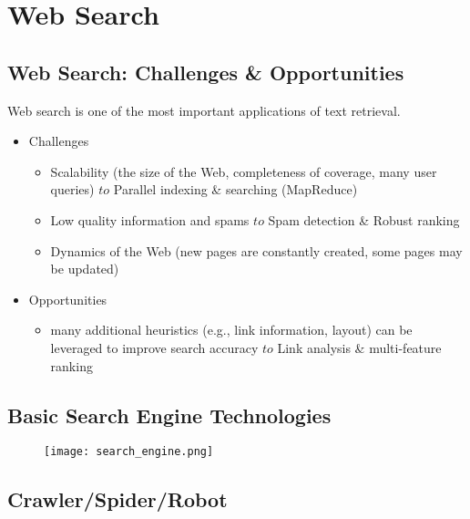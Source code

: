 \newpage
\section{Web Search}

\subsection{Web Search: Challenges \& Opportunities}
Web search is one of the most important applications of text retrieval.
\begin{itemize}
\item Challenges
\begin{itemize}
\item Scalability (the size of the Web, completeness of coverage, many user queries) $to$ Parallel indexing \& searching (MapReduce)
\item Low quality information and spams $to$ Spam detection \& Robust ranking
\item Dynamics of the Web (new pages are constantly created, some pages may be updated)
\end{itemize}

\item Opportunities
\begin{itemize}
\item many additional heuristics (e.g., link information, layout) can be leveraged to improve search accuracy $to$ Link analysis \& multi-feature ranking
\end{itemize}
\end{itemize}


\subsection{Basic Search Engine Technologies}
\begin{figure}[H]
    \centering
    \texttt{[image: search\_engine.png]}
\end{figure}

\subsection{Crawler/Spider/Robot}


